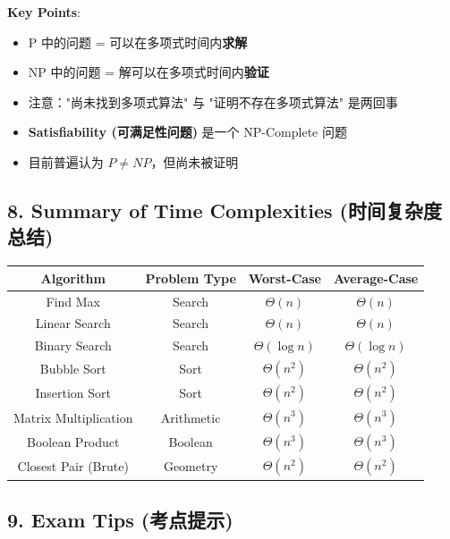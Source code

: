 \documentclass[10pt,a4paper,openany]{ctexbook}
\theoremstyle{definition}
\theoremstyle{remark}
\begin{document}
\textbf{Key Points}:
\begin{itemize}
\item P 中的问题 = 可以在多项式时间内\textbf{求解}
\item NP 中的问题 = 解可以在多项式时间内\textbf{验证}
\item 注意："尚未找到多项式算法" 与 "证明不存在多项式算法" 是两回事
\item \textbf{Satisfiability (可满足性问题)} 是一个 NP-Complete 问题
\item 目前普遍认为 $P \neq NP$，但尚未被证明

\end{itemize}

\vspace{-2pt}

\subsection{8. Summary of Time Complexities (时间复杂度总结)}

\begin{center}
\begin{tabular}{cccc}
\hline
Algorithm & Problem Type & Worst-Case & Average-Case \\ \hline
Find Max & Search & $\Theta(n)$ & $\Theta(n)$ \\
Linear Search & Search & $\Theta(n)$ & $\Theta(n)$ \\
Binary Search & Search & $\Theta(\log n)$ & $\Theta(\log n)$ \\
Bubble Sort & Sort & $\Theta(n^2)$ & $\Theta(n^2)$ \\
Insertion Sort & Sort & $\Theta(n^2)$ & $\Theta(n^2)$ \\
Matrix Multiplication & Arithmetic & $\Theta(n^3)$ & $\Theta(n^3)$ \\
Boolean Product & Boolean & $\Theta(n^3)$ & $\Theta(n^3)$ \\
Closest Pair (Brute) & Geometry & $\Theta(n^2)$ & $\Theta(n^2)$ \\
\hline
\end{tabular}

\end{center}

\vspace{-2pt}

\subsection{9. Exam Tips (考点提示)}
\end{document}
